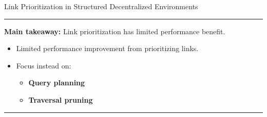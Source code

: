 \begin{frame}{Link Prioritization in Structured Decentralized Environments}

    \rule{\linewidth}{0.4pt}

    \textbf{Main takeaway:} Link prioritization has limited performance benefit.

    \vspace{0.6em}
    \begin{itemize}
        \item Limited performance improvement from prioritizing links.
        \item Focus instead on:
        \begin{itemize}
            \item \textbf{Query planning} \textcite{hanski2025link}
            \item \textbf{Traversal pruning} \textcite{tam2024opportunities}
        \end{itemize}
    \end{itemize}

    \rule{\linewidth}{0.4pt}

\end{frame}
